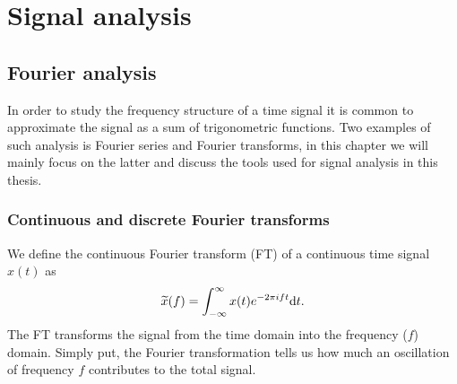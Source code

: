 \chapter{Signal analysis} \label{ch:signal}
\section{Fourier analysis}
In order to study the frequency structure of a time signal it is common 
to approximate the signal as a sum of trigonometric functions. Two examples
of such analysis is Fourier series and Fourier transforms, in this chapter we will mainly
focus on the latter and discuss the tools used for signal analysis in this thesis.
\subsection{Continuous and discrete Fourier transforms}
We define the continuous Fourier transform (FT) of a continuous time signal $x(t)$ as  
\begin{equation} \label{eqSA:cf}
\widetilde{x}(f) = \int_{-\infty}^{\infty} x(t) e^{-2 \pi i f t} \mathrm{d} t. 
\end{equation}
The FT transforms the signal from the time domain into the frequency ($f$) domain.
Simply put, the Fourier transformation tells us how much an oscillation of frequency $f$ contributes to the total signal. 

